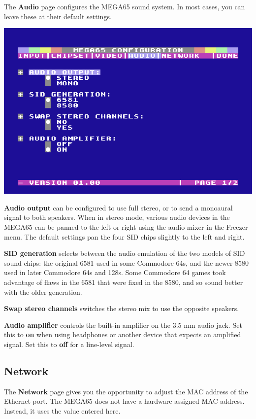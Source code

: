 The {\bf Audio} page configures the MEGA65 sound system. In most cases, you can leave these at their default settings.

\begin{center}
  \includegraphics[width=0.7\linewidth]{images/ss-m65config-4.png}
\end{center}

{\bf Audio output} can be configured to use full stereo, or to send a monoaural signal to both speakers. When in stereo mode, various audio devices in the MEGA65 can be panned to the left or right using the audio mixer in the Freezer menu. The default settings pan the four SID chips slightly to the left and right.

{\bf SID generation} selects between the audio emulation of the two models of SID sound chips: the original 6581 used in some Commodore 64s, and the newer 8580 used in later Commodore 64s and 128s. Some Commodore 64 games took advantage of flaws in the 6581 that were fixed in the 8580, and so sound better with the older generation.

{\bf Swap stereo channels} switches the stereo mix to use the opposite speakers.

{\bf Audio amplifier} controls the built-in amplifier on the 3.5 mm audio jack. Set this to {\bf on} when using headphones or another device that expects an amplified signal. Set this to {\bf off} for a line-level signal.

\subsection{Network}

The {\bf Network} page gives you the opportunity to adjust the MAC address of the Ethernet port. The MEGA65 does not have a hardware-assigned MAC address. Instead, it uses the value entered here.


